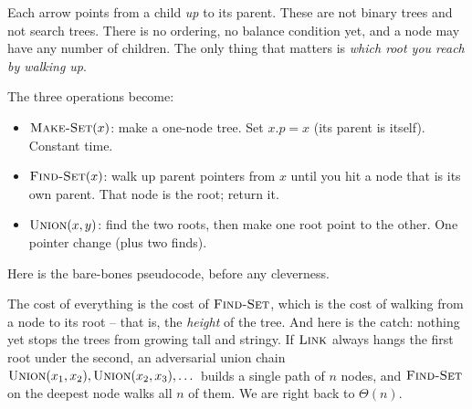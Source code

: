 Each arrow points from a child \emph{up} to its parent. These are not
binary trees and not search trees. There is no ordering, no balance condition
yet, and a node may have any number of children. The only thing that matters is
\emph{which root you reach by walking up}.

The three operations become:

\begin{itemize}
  \item $\textsc{Make-Set}(x)$: make a one-node tree. Set $x.p = x$ (its parent
        is itself). Constant time.
  \item $\textsc{Find-Set}(x)$: walk up parent pointers from $x$ until you hit a
        node that is its own parent. That node is the root; return it.
  \item $\textsc{Union}(x, y)$: find the two roots, then make one root point to
        the other. One pointer change (plus two finds).
\end{itemize}

Here is the bare-bones pseudocode, before any cleverness.

\begin{algorithm}[H]
\caption{Naive forest operations}
\end{algorithm}

The cost of everything is the cost of $\textsc{Find-Set}$, which is the cost of
walking from a node to its root -- that is, the \emph{height} of the tree. And
here is the catch: nothing yet stops the trees from growing tall and stringy.
If $\textsc{Link}$ always hangs the first root under the second, an
adversarial union chain $\textsc{Union}(x_1, x_2), \textsc{Union}(x_2, x_3), \dots$ builds a single path of $n$ nodes, and
$\textsc{Find-Set}$ on the deepest node walks all $n$ of them. We are right back
to $\Theta(n)$.


